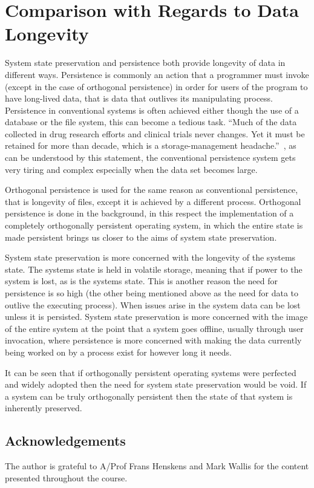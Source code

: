 \documentclass[a4paper,12pt]{article}
\begin{document}
\section{Comparison with Regards to Data Longevity}\label{sec:discussion}
System state preservation and persistence both provide longevity of data in different ways. Persistence is commonly an action that a programmer must invoke (except in the case of orthogonal persistence) in order for users of the program to have long-lived data, that is data that outlives its manipulating process. Persistence in conventional systems is often achieved either though the use of a database or the file system, this can become a tedious task. ``Much of the data collected in drug research efforts and clinical trials never changes. Yet it must be retained for more than decade, which is a storage-management headache.''~\citep[p.~1]{EMC}, as can be understood by this statement, the conventional persistence system gets very tiring and complex especially when the data set becomes large.
\\\par
Orthogonal persistence is used for the same reason as conventional persistence, that is longevity of files, except it is achieved by a different process. Orthogonal persistence is done in the background, in this respect the implementation of a completely orthogonally persistent operating system, in which the entire state is made persistent brings us closer to the aims of system state preservation.
\\\par
System state preservation is more concerned with the longevity of the systems state. The systems state is held in volatile storage, meaning that if power to the system is lost, as is the systems state. This is another reason the need for persistence is so high (the other being mentioned above as the need for data to outlive the executing process). When issues arise in the system data can be lost unless it is persisted.
System state preservation is more concerned with the image of the entire system at the point that a system goes offline, usually through user invocation, where persistence is more concerned with making the data currently being worked on by a process exist for however long it needs.
\\\par
It can be seen that if orthogonally persistent operating systems were perfected and widely adopted then the need for system state preservation would be void. If a system can be truly orthogonally persistent then the state of that system is inherently preserved.
%
\subsection*{Acknowledgements}
The author is grateful to A/Prof Frans Henskens and Mark Wallis for the content presented throughout the course.
\newpage

%

\vskip 0.2in
\newpage


\end{document}
